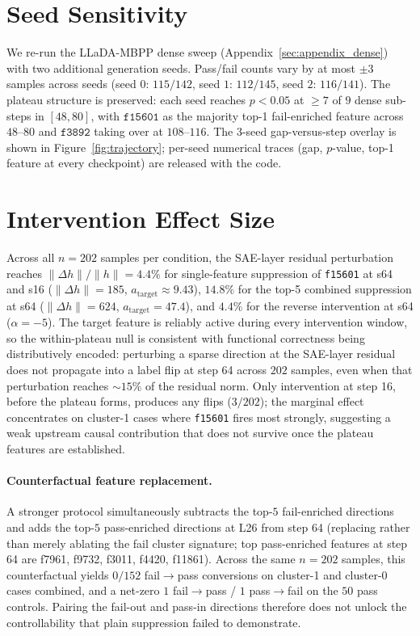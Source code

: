 \documentclass[11pt]{article}
\begin{document}
\section{Seed Sensitivity}
\label{sec:appendix_seed}

We re-run the LLaDA-MBPP dense sweep (Appendix~\ref{sec:appendix_dense}) with two additional generation seeds.
Pass/fail counts vary by at most $\pm 3$ samples across seeds (seed $0$: $115/142$, seed $1$: $112/145$, seed $2$: $116/141$).
The plateau structure is preserved: each seed reaches $p\!<\!0.05$ at $\ge\!7$ of $9$ dense sub-steps in $[48,80]$, with $\texttt{f15601}$ as the majority top-1 fail-enriched feature across $48$--$80$ and $\texttt{f3892}$ taking over at $108$--$116$.
The 3-seed gap-versus-step overlay is shown in Figure~\ref{fig:trajectory}; per-seed numerical traces (gap, $p$-value, top-1 feature at every checkpoint) are released with the code.

\section{Intervention Effect Size}
\label{sec:appendix_effect}

Across all $n{=}202$ samples per condition, the SAE-layer residual perturbation reaches $\|\Delta h\|/\|h\|{=}4.4\%$ for single-feature suppression of \texttt{f15601} at s64 and s16 ($\|\Delta h\|{=}185$, $a_{\text{target}}{\approx}9.43$), $14.8\%$ for the top-5 combined suppression at s64 ($\|\Delta h\|{=}624$, $a_{\text{target}}{=}47.4$), and $4.4\%$ for the reverse intervention at s64 ($\alpha{=}-5$).
The target feature is reliably active during every intervention window, so the within-plateau null is consistent with functional correctness being distributively encoded: perturbing a sparse direction at the SAE-layer residual does not propagate into a label flip at step 64 across $202$ samples, even when that perturbation reaches $\sim$$15\%$ of the residual norm.
Only intervention at step 16, before the plateau forms, produces any flips ($3/202$); the marginal effect concentrates on cluster-1 cases where \texttt{f15601} fires most strongly, suggesting a weak upstream causal contribution that does not survive once the plateau features are established.

\paragraph{Counterfactual feature replacement.}
A stronger protocol simultaneously subtracts the top-$5$ fail-enriched directions and adds the top-$5$ pass-enriched directions at L26 from step 64 (replacing rather than merely ablating the fail cluster signature; top pass-enriched features at step 64 are f7961, f9732, f3011, f4420, f11861).
Across the same $n\!=\!202$ samples, this counterfactual yields $0/152$ fail$\to$pass conversions on cluster-1 and cluster-0 cases combined, and a net-zero $1$ fail$\to$pass / $1$ pass$\to$fail on the $50$ pass controls.
Pairing the fail-out and pass-in directions therefore does not unlock the controllability that plain suppression failed to demonstrate.
\end{document}
